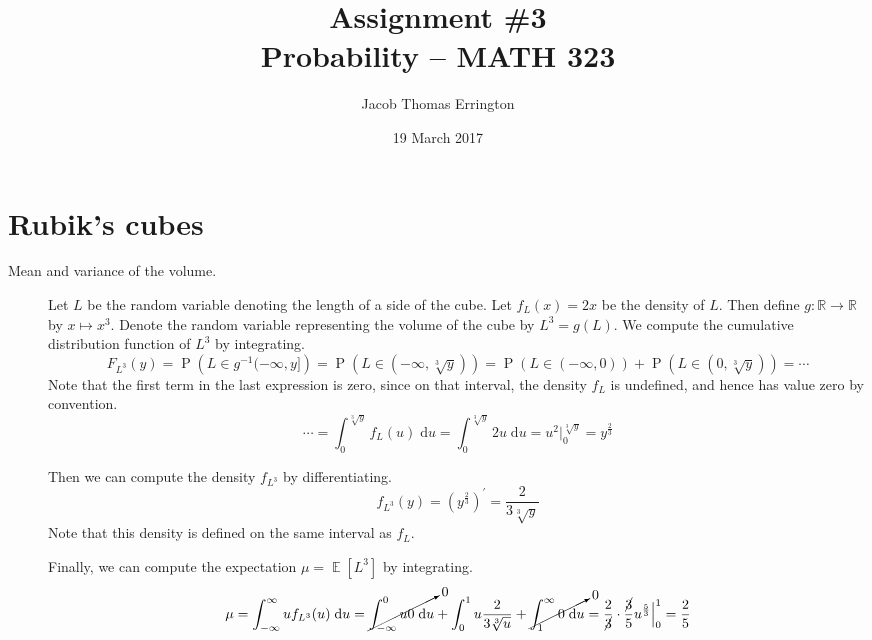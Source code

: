 \documentclass[11pt]{article}
\author{Jacob Thomas Errington}
\title{Assignment \#3\\Probability -- MATH 323}
\date{19 March 2017}
\theoremstyle{definition}
\theoremstyle{remark}
\newcommand{\question}{\section}
\newcommand{\parens}[1]{\left(#1\right)}
\newcommand{\inv}{^{-1}}
\renewcommand{\d}{\mathrm{d}}
\newcommand{\intd}{\;\d}
\newcommand{\infinfint}{%
    \ensuremath \int_{-\infty}^{\infty}
}
\newcommand{\intfrominf}{%
    \ensuremath \int_{-\infty}
}
\newcommand{\inttoinf}{%
    \ensuremath \int^{\infty}
}
\newcommand{\evaluated}[2]{
    \Big\vert_{#1}^{#2}
}
\newcommand{\R}{\mathbb{R}}
\DeclareMathOperator{\Prob}{P}
\renewcommand{\P}[1]{\Prob{\parens{#1}}}
\DeclareMathOperator{\Expect}{\mathbb{E}}
\newcommand{\E}[1]{\Expect{\left[#1\right]}}
\newcommand{\cdf}{cumulative distribution function}
\begin{document}
\maketitle

\question{Rubik's cubes}

\begin{description}
    \item[Mean and variance of the volume.]
        Let $L$ be the random variable denoting the length of a side of the
        cube.
        Let $f_L(x) = 2x$ be the density of $L$.
        Then define $g : \R \to \R$ by $x \mapsto x^3$.
        Denote the random variable representing the volume of the cube by
        $L^3 = g(L)$.
        We compute the \cdf{} of $L^3$ by integrating.
        \begin{equation*}
            F_{L^3}(y)
            = \P{L \in g\inv(-\infty, y]}
            = \P{L \in (-\infty, \sqrt[3]{y})}
            = \P{L \in (-\infty, 0)} + \P{L \in (0, \sqrt[3]{y})}
            = \cdots
        \end{equation*}
        Note that the first term in the last expression is zero, since on that
        interval, the density $f_L$ is undefined, and hence has value zero by
        convention.
        \begin{equation*}
            \cdots
            = \int_0^{\sqrt[3]{y}} f_L (u) \intd u
            = \int_0^{\sqrt[3]{y}} 2u \intd u
            = u^2 \evaluated{0}{\sqrt[3]{y}}
            = y^{\frac{2}{3}}
        \end{equation*}

        Then we can compute the density $f_{L^3}$ by differentiating.
        \begin{equation*}
            f_{L^3}(y) = \parens{y^{\frac{2}{3}}}^\prime = \frac{2}{3 \sqrt[3]{y}}
        \end{equation*}
        Note that this density is defined on the same interval as $f_L$.

        Finally, we can compute the expectation $\mu = \E{L^3}$ by integrating.
        \begin{equation*}
            \mu
            = \infinfint u f_{L^3} (u) \intd u 
            = \cancelto{0}{\intfrominf^0 u 0 \intd u}
            + \int_0^1 u \frac{2}{3 \sqrt[3]{u}}
            + \cancelto{0}{\inttoinf_1 0 \intd u}
            = \frac{2}{\cancel 3} \cdot \frac{\cancel 3}{5}
                u^{\frac{5}{3}} \evaluated{0}{1}
            = \frac{2}{5}
        \end{equation*}


\end{description}
\end{document}
